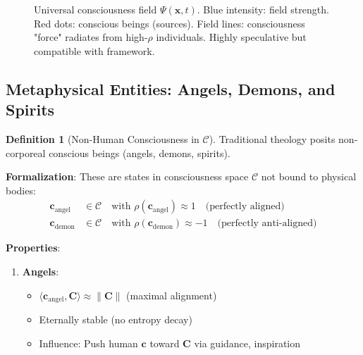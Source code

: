 \documentclass[11pt,a4paper]{article}
\theoremstyle{definition}
\newtheorem{definition}{Definition}[section]
\theoremstyle{remark}
\newcommand{\CC}{\mathcal{C}}
\newcommand{\cc}{\mathbf{c}}
\begin{document}
\begin{small}
\begin{enumerate}
\begin{figure}[H]
\caption{Universal consciousness field \(\Psi(\mathbf{x}, t)\). Blue intensity: field strength. Red dots: conscious beings (sources). Field lines: consciousness "force" radiates from high-\(\rho\) individuals. Highly speculative but compatible with framework.}
\label{fig:universal_psi_field}
\end{figure}

\subsection{Metaphysical Entities: Angels, Demons, and Spirits}

\begin{definition}[Non-Human Consciousness in \(\CC\)]
Traditional theology posits non-corporeal conscious beings (angels, demons, spirits).

\textbf{Formalization}: These are states in consciousness space \(\CC\) not bound to physical bodies:
\begin{align}
\cc_{\text{angel}} &\in \CC \quad \text{with } \rho(\cc_{\text{angel}}) \approx 1 \quad \text{(perfectly aligned)} \\
\cc_{\text{demon}} &\in \CC \quad \text{with } \rho(\cc_{\text{demon}}) \approx -1 \quad \text{(perfectly anti-aligned)}
\end{align}

\textbf{Properties}:
\begin{enumerate}
    \item \textbf{Angels}:
        \begin{itemize}
            \item \(\langle \cc_{\text{angel}}, \mathbf{C} \rangle \approx \|\mathbf{C}\|\) (maximal alignment)
            \item Eternally stable (no entropy decay)
            \item Influence: Push human \(\cc\) toward \(\mathbf{C}\) via guidance, inspiration
        \end{itemize}
    

\end{enumerate}
\end{definition}
\end{enumerate}
\end{small}
\end{document}
